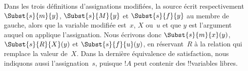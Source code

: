 \documentclass[../../../include/open-logic-section]{subfiles}
\begin{document}
\begin{editorial}
Dans les trois définitions d'assignations modifiées,
la source écrit respectivement
$\Subst{s}{m}{y}$, $\Subst{s}{M}{y}$ et
$\Subst{s}{f}{y}$ au membre de gauche, alors que
la variable modifiée est~$x$, $X$ ou~$u$ et que
$y$ est l'argument auquel on applique
l'assignation. Nous écrivons donc
$\Subst{s}{m}{x}(y)$,
$\Subst{s}{R}{X}(y)$ et
$\Subst{s}{f}{u}(y)$, en réservant~$R$ à la
relation qui remplace la valeur de~$X$.
Dans la dernière équivalence de satisfaction,
nous indiquons aussi l'assignation~$s$, puisque
$!A$ peut contenir des !!{variable}s libres.
\end{editorial}
\end{document}
